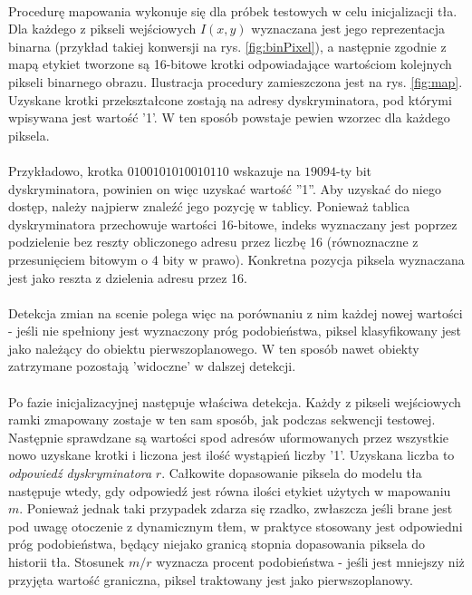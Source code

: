 \paragraph{}
Procedurę mapowania wykonuje się dla próbek testowych w celu inicjalizacji tła. Dla każdego z pikseli wejściowych $I(x,y)$ wyznaczana jest jego reprezentacja binarna (przykład takiej konwersji na rys. \ref{fig:binPixel}), a następnie zgodnie z mapą etykiet tworzone są 16-bitowe krotki odpowiadające wartościom kolejnych pikseli binarnego obrazu. Ilustracja procedury zamieszczona jest na rys. \ref{fig:map}. Uzyskane krotki przekształcone zostają na adresy dyskryminatora, pod którymi wpisywana jest wartość '1'. W ten sposób powstaje pewien wzorzec dla każdego piksela.
\paragraph{}
Przykładowo, krotka $0100101010010110$ wskazuje na $19094$-ty bit dyskryminatora, powinien on więc uzyskać wartość ''1''. Aby uzyskać do niego dostęp, należy najpierw znaleźć jego pozycję w tablicy. Ponieważ tablica dyskryminatora przechowuje wartości 16-bitowe, indeks wyznaczany jest poprzez podzielenie bez reszty obliczonego adresu przez liczbę 16 (równoznaczne z przesunięciem bitowym o 4 bity w prawo). Konkretna pozycja piksela wyznaczana jest jako reszta z dzielenia adresu przez 16.   
\paragraph{}
Detekcja zmian na scenie polega więc na porównaniu z nim każdej nowej wartości - jeśli nie spełniony jest wyznaczony próg podobieństwa, piksel klasyfikowany jest jako należący do obiektu pierwszoplanowego. W ten sposób nawet obiekty zatrzymane pozostają 'widoczne' w dalszej detekcji.
\paragraph{}
Po fazie inicjalizacyjnej następuje właściwa detekcja. Każdy z pikseli wejściowych ramki zmapowany zostaje w ten sam sposób, jak podczas sekwencji testowej. Następnie sprawdzane są wartości spod adresów uformowanych przez wszystkie nowo uzyskane krotki i liczona jest ilość wystąpień liczby '1'. Uzyskana liczba to \textit{odpowiedź dyskryminatora} $r$. Całkowite dopasowanie piksela do modelu tła następuje wtedy, gdy odpowiedź jest równa ilości etykiet użytych w mapowaniu $m$. Ponieważ jednak taki przypadek zdarza się rzadko, zwłaszcza jeśli brane jest pod uwagę otoczenie z dynamicznym tłem, w praktyce stosowany jest odpowiedni próg podobieństwa, będący niejako granicą stopnia dopasowania piksela do historii tła. Stosunek $m/r$ wyznacza procent podobieństwa - jeśli jest mniejszy niż przyjęta wartość graniczna, piksel traktowany jest jako pierwszoplanowy.
